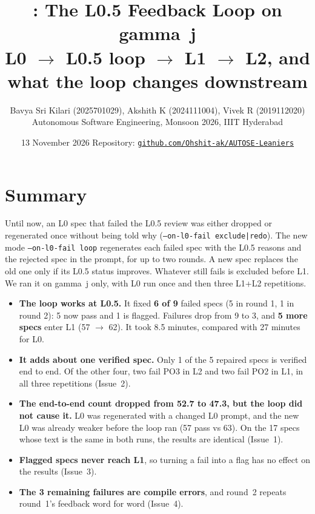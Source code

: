 \documentclass[10pt,a4paper]{article}
\title{\vspace{-1.3cm}\textbf{\cf: The L0.5 Feedback Loop on gamma~j}\\[2pt]
\large L0 $\rightarrow$ L0.5 loop $\rightarrow$ L1 $\rightarrow$ L2, and what the loop changes downstream}
\author{Bavya Sri Kilari (2025701029), Akshith K (2024111004), Vivek R (2019112020)\\
\small Autonomous Software Engineering, Monsoon 2026, IIIT Hyderabad}
\date{\small 13 November 2026 \quad Repository: \href{https://github.com/Ohshit-ak/AUTOSE-Leaniers}{\nolinkurl{github.com/Ohshit-ak/AUTOSE-Leaniers}}}
\newcommand{\code}[1]{\texttt{\small #1}}
\begin{document}
\maketitle
\vspace{-0.9cm}

\section{Summary}
Until now, an L0 spec that failed the L0.5 review was either dropped or regenerated once without being told why
(\code{--on-l0-fail exclude|redo}). The new mode \code{--on-l0-fail loop} regenerates each failed spec with the L0.5
reasons and the rejected spec in the prompt, for up to two rounds. A new spec replaces the old one only if its L0.5 status
improves. Whatever still fails is excluded before L1. We ran it on gamma~j only, with L0 run once and then three L1+L2
repetitions.
\begin{itemize}
\item \textbf{The loop works at L0.5.} It fixed \textbf{6 of 9} failed specs (5 in round 1, 1 in round 2): 5 now pass and 1
      is flagged. Failures drop from 9 to 3, and \textbf{5 more specs} enter L1 (57 $\rightarrow$ 62). It took 8.5 minutes,
      compared with 27 minutes for L0.
\item \textbf{It adds about one verified spec.} Only 1 of the 5 repaired specs is verified end to end. Of the other four,
      two fail PO3 in L2 and two fail PO2 in L1, in all three repetitions (Issue~2).
\item \textbf{The end-to-end count dropped from 52.7 to 47.3, but the loop did not cause it.} L0 was regenerated with a
      changed L0 prompt, and the new L0 was already weaker before the loop ran (57 pass vs 63). On the 17 specs whose text is
      the same in both runs, the results are identical (Issue~1).
\item \textbf{Flagged specs never reach L1}, so turning a fail into a flag has no effect on the results (Issue~3).
\item \textbf{The 3 remaining failures are compile errors}, and round~2 repeats round~1's feedback word for word (Issue~4).
\end{itemize}
\end{document}
